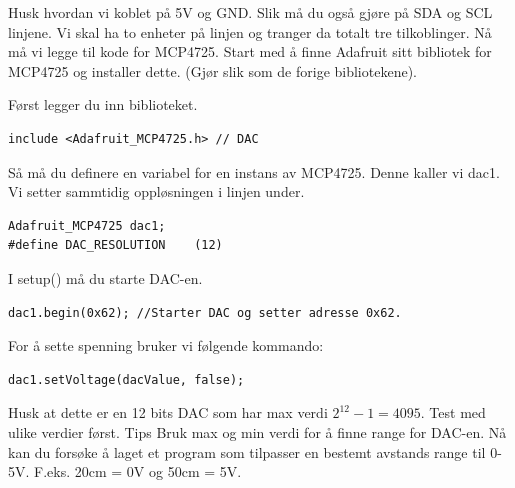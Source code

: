 \vskip 5pt 

Husk hvordan vi koblet på 5V og GND. Slik må du også gjøre på SDA og SCL linjene. Vi skal ha to enheter på linjen og tranger da totalt tre tilkoblinger. 
\vskip 5pt 
Nå må vi legge til kode for MCP4725. Start med å finne Adafruit sitt  bibliotek for MCP4725 og installer dette. (Gjør slik som de forige bibliotekene). 


\vskip 5pt 
Først legger du inn biblioteket.


\begin{lstlisting}[language=Arduino]
include <Adafruit_MCP4725.h> // DAC
\end{lstlisting}

\vskip 5pt 
Så må du definere en variabel for en instans av MCP4725. Denne kaller vi dac1. Vi setter sammtidig oppløsningen i linjen under. 
\begin{lstlisting}[language=Arduino]
Adafruit_MCP4725 dac1;
#define DAC_RESOLUTION    (12)
\end{lstlisting}

\vskip 5pt 

I setup() må du starte DAC-en. 

\begin{lstlisting}[language=Arduino]
dac1.begin(0x62); //Starter DAC og setter adresse 0x62. 
\end{lstlisting}

\vskip 5pt 
For å sette spenning bruker vi følgende kommando:

\begin{lstlisting}[language=Arduino]
dac1.setVoltage(dacValue, false);
\end{lstlisting}

\vskip 5pt 
Husk at dette er en 12 bits DAC som har max verdi $2^{12}-1=4095$. Test med ulike verdier først. Tips Bruk max og min verdi for å finne range for DAC-en.
\vskip 5pt 
Nå kan du forsøke å laget et program som tilpasser en bestemt avstands range til 0-5V. F.eks. 20cm = 0V og 50cm  = 5V. 



\vskip 5pt 




